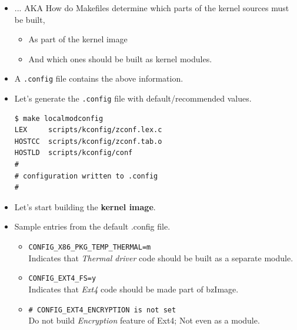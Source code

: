 \documentclass{beamer}
\begin{document}
\begin{frame}[fragile]
  \begin{itemize}
  \item ... AKA How do Makefiles determine which parts of the kernel sources must be built,
    \begin{itemize}
    \item As part of the kernel image
    \item And which ones should be built as kernel modules.
    \end{itemize}
  \item A \texttt{.config} file contains the above information.
  \item Let's generate the \texttt{.config} file with default/recommended
    values.
    \begin{lstlisting}
$ make localmodconfig
LEX     scripts/kconfig/zconf.lex.c
HOSTCC  scripts/kconfig/zconf.tab.o
HOSTLD  scripts/kconfig/conf
#
# configuration written to .config
#
\end{lstlisting}
  \item Let's start building the \textbf{kernel image}.
\end{itemize}
\end{frame}

\begin{frame}[fragile]
  \begin{itemize}
\item Sample entries from the default .config file.
  \begin{itemize}
  \item \texttt{CONFIG\_X86\_PKG\_TEMP\_THERMAL=m} \\
    Indicates that \emph{Thermal driver} code should be built as a separate module.
  \item \texttt{CONFIG\_EXT4\_FS=y} \\
    Indicates that \emph{Ext4} code should be made part of bzImage.
  \item \texttt{\# CONFIG\_EXT4\_ENCRYPTION is not set} \\
    Do not build \emph{Encryption} feature of Ext4; Not even as a module.
  \end{itemize}
\begin{lstlisting}
\end{lstlisting}
\end{itemize}
\end{frame}
\end{document}
